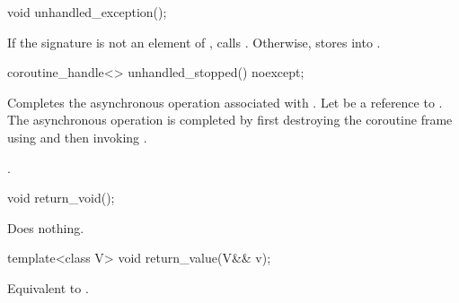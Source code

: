 %
\begin{itemdecl}
void unhandled_exception();
\end{itemdecl}
\begin{itemdescr}
\pnum
\effects
If the signature  is not an element
of , calls .
Otherwise, stores  into
.
\end{itemdescr}

%
\begin{itemdecl}
coroutine_handle<> unhandled_stopped() noexcept;
\end{itemdecl}
\begin{itemdescr}
\pnum
\effects
Completes the asynchronous operation associated with .
Let  be a reference to .
The asynchronous operation is completed by first
destroying the coroutine frame
using  and then
invoking .
\end{itemdescr}
\begin{itemdescr}
\pnum
\returns
{}.
\end{itemdescr}

%
\begin{itemdecl}
void return_void();
\end{itemdecl}
\begin{itemdescr}
\pnum
\effects
Does nothing.
\end{itemdescr}

%
\begin{itemdecl}
template<class V>
  void return_value(V&& v);
\end{itemdecl}
\begin{itemdescr}
\pnum
\effects
Equivalent to .
\end{itemdescr}

